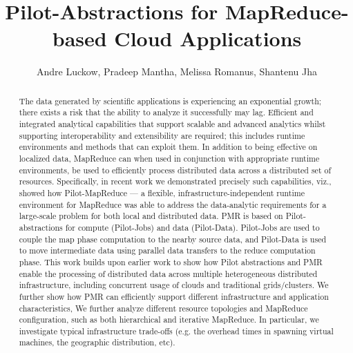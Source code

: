 \documentclass[times]{cpeauth}
\begin{document}

\title{Pilot-Abstractions for MapReduce-based Cloud Applications}



\author{Andre Luckow, Pradeep Mantha, Melissa Romanus, Shantenu
  Jha\corrauth}

\address{Radical Research Group, Rutgers University}


\begin{abstract}

The data generated by scientific applications is experiencing an
exponential growth; there exists a risk that the ability to analyze it
successfully may lag. Efficient and integrated analytical capabilities
that support scalable and advanced analytics whilst supporting
interoperability and extensibility are required; this includes runtime
environments and methods that can exploit them.  In addition to being
effective on localized data, MapReduce can when used in conjunction
with appropriate runtime environments, be used to efficiently process
distributed data across a distributed set of resources.  Specifically,
in recent work we demonstrated precisely such capabilities, viz.,
showed how Pilot-MapReduce --- a flexible, infrastructure-independent
runtime environment for MapReduce was able to address the
data-analytic requirements for a large-scale problem for both local
and distributed data.  PMR is based on Pilot-abstractions for compute
(Pilot-Jobs) and data (Pilot-Data). Pilot-Jobs are used to couple the
map phase computation to the nearby source data, and Pilot-Data is
used to move intermediate data using parallel data transfers to the
reduce computation phase.  This work builds upon earlier work to show
how Pilot abstractions and PMR enable the processing of distributed
data across multiple heterogeneous distributed infrastructure,
including concurrent usage of clouds and traditional
grids/clusters. We further show how PMR can efficiently support
different infrastructure and application characteristics, We further
analyze different resource topologies and MapReduce configuration,
such as both hierarchical and iterative MapReduce. In particular, we
investigate typical infrastructure trade-offs (e.g. the overhead times
in spawning virtual machines, the geographic distribution, etc).

\end{abstract}
\end{document}

